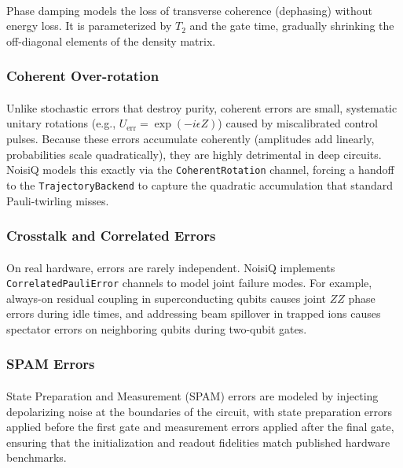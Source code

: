 \documentclass[10pt,twocolumn]{article}
\begin{document}
\paragraph{}
Phase damping models the loss of transverse coherence (dephasing) without energy loss. 
It is parameterized by $T_2$ and the gate time, gradually shrinking the off-diagonal elements of the density matrix.

\subsubsection{Coherent Over-rotation}
\paragraph{}
Unlike stochastic errors that destroy purity, coherent errors are small, systematic unitary rotations (e.g., $U_{\text{err}} = \exp(-i \epsilon Z)$) caused by miscalibrated control pulses. 
Because these errors accumulate coherently (amplitudes add linearly, probabilities scale quadratically), they are highly detrimental in deep circuits. 
NoisiQ models this exactly via the \texttt{CoherentRotation} channel, forcing a handoff to the \texttt{TrajectoryBackend} to capture the quadratic accumulation that standard Pauli-twirling \cite{wallman2016, emerson2007} misses.

\subsubsection{Crosstalk and Correlated Errors}
\paragraph{}
On real hardware, errors are rarely independent. NoisiQ implements \texttt{CorrelatedPauliError} channels to model joint failure modes. 
For example, always-on residual coupling in superconducting qubits causes joint $ZZ$ phase errors during idle times, and addressing beam spillover in trapped ions causes spectator errors on neighboring qubits during two-qubit gates.

\subsubsection{SPAM Errors}
\paragraph{}
State Preparation and Measurement (SPAM) errors are modeled by injecting depolarizing noise at the boundaries of the circuit, 
with state preparation errors applied before the first gate and measurement errors applied after the final gate,
ensuring that the initialization and readout fidelities match published hardware benchmarks.
\end{document}
